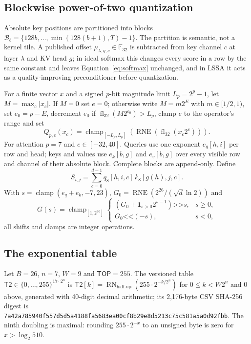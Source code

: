 \documentclass{article}
\newcommand{\Fth}{\mathbb{F}_{32}}
\newcommand{\fl}{\operatorname{fl}_{32}}
\newcommand{\rne}{\operatorname{RNE}}
\begin{document}
\subsection{Blockwise power-of-two quantization}

Absolute key positions are partitioned into blocks
$\mathcal{B}_b=\{128b,\ldots,\min(128(b+1),T)-1\}$.  The partition is semantic, not a kernel
tile.  A published offset $\mu_{\lambda,g,c}\in\Fth$ is subtracted from key channel $c$ at
layer $\lambda$ and KV head $g$; in ideal softmax this changes every score in a row by the
same constant and leaves Equation~\eqref{eq:softmax} unchanged, and in LSSA it acts as a
quality-improving preconditioner before quantization.

For a finite vector $x$ and a signed $p$-bit magnitude limit $L_p=2^p-1$, let
$M=\max_c|x_c|$.  If $M=0$ set $e=0$; otherwise write $M=m2^E$ with $m\in[1/2,1)$, set
$e_0=p-E$, decrement $e_0$ if $\fl(M2^{e_0})>L_p$, clamp $e$ to the operator's range and set
\begin{equation}
  Q_{p,e}(x_c)=\operatorname{clamp}_{[-L_p,L_p]}
  \left(\rne\left(\fl(x_c2^e)\right)\right).
  \label{eq:quant}
\end{equation}
For attention $p=7$ and $e\in[-32,40]$.  Queries use one exponent $e_q[h,i]$ per row and
head; keys and values use $e_k[b,g]$ and $e_v[b,g]$ over every visible row and channel of
their absolute block.  Complete blocks are append-only.  Define
\begin{equation}
  S_{i,j}=\sum_{c=0}^{d-1}q_8[h,i,c]\,k_8[g(h),j,c].
  \label{eq:score}
\end{equation}
With $s=\operatorname{clamp}(e_q+e_k,-7,23)$, $G_0=\rne(2^{26}/(\sqrt d\ln 2))$ and
\begin{equation}
  G(s)=\operatorname{clamp}_{[1,2^{30}]}
  \begin{cases}
    (G_0+\mathbf{1}_{s>0}2^{s-1})\mathbin{\texttt{>>}}s,&s\geq0,\\
    G_0\mathbin{\texttt{<<}}(-s),&s<0,
  \end{cases}
  \label{eq:gfold}
\end{equation}
all shifts and clamps are integer operations.

\subsection{The exponential table}

Let $B=26$, $n=7$, $W=9$ and $\mathsf{TOP}=255$.  The versioned table
$\mathsf{T2}\in\{0,\ldots,255\}^{17\cdot2^n}$ is
$\mathsf{T2}[k]=\operatorname{RN}_{\mathrm{half\mbox{-}up}}(255\cdot2^{-k/2^n})$ for
$0\leq k<W2^n$ and $0$ above, generated with 40-digit decimal arithmetic; its 2,176-byte CSV
SHA-256 digest is
\texttt{7a42a785940f557d5d5a4188fa5683ea00cf8b29e8d5213c75c581a5a0d92fbb}.  The ninth
doubling is maximal: rounding $255\cdot2^{-x}$ to an unsigned byte is zero for
$x>\log_2 510$.
\end{document}
